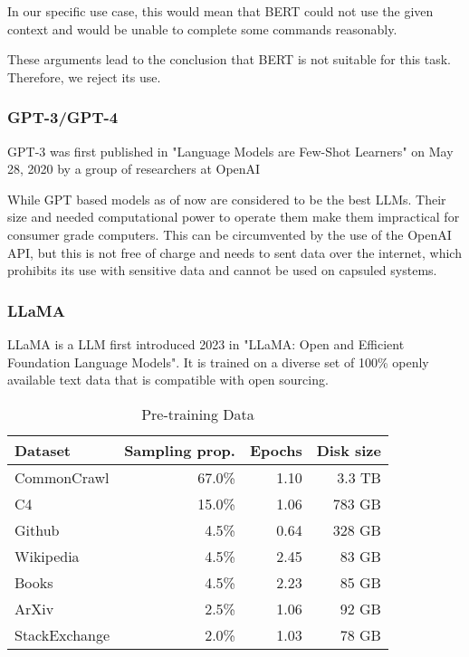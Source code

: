 In our specific use case, this would mean that BERT could not use the given context and would be unable to complete some commands reasonably. 


These arguments lead to the conclusion that BERT is not suitable for this task. Therefore, we reject its use.





\subsubsection{GPT-3/GPT-4}


GPT-3 was first published in "Language Models are Few-Shot Learners" on May 28, 2020 by a group of researchers at OpenAI


While GPT based models as of now are considered to be the best LLMs. Their size and needed computational power to operate them make them impractical for consumer grade computers. This can be circumvented by the use of the OpenAI API, but this is not free of charge and needs to sent data over the internet, which prohibits its use with sensitive data and cannot be used on capsuled systems. 


\subsubsection{LLaMA} 

LLaMA is a LLM first introduced 2023 in "LLaMA: Open and Efficient Foundation Language Models"\cite{touvron2023llama}. It is trained on a diverse set of  100\% openly available text data that is compatible with open sourcing\cite{touvron2023llama}.

\begin{table}[htbp]
\centering
\caption{Pre-training Data\cite{touvron2023llama}}
\begin{tabular}{|l|r|r|r|}
\hline
\textbf{Dataset} & \textbf{Sampling prop.} & \textbf{Epochs} & \textbf{Disk size} \\
\hline
CommonCrawl & 67.0\% & 1.10 & 3.3 TB \\
C4 & 15.0\% & 1.06 & 783 GB \\
Github & 4.5\% & 0.64 & 328 GB \\
Wikipedia & 4.5\% & 2.45 & 83 GB \\
Books & 4.5\% & 2.23 & 85 GB \\
ArXiv & 2.5\% & 1.06 & 92 GB \\
StackExchange & 2.0\% & 1.03 & 78 GB \\
\hline
\end{tabular}
\end{table}

